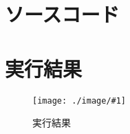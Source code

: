 \documentclass[a4paper,11pt]{ltjsarticle}
\newcommand{\fig}[4]{
    \begin{figure}[htbp]
      \centering
      \texttt{[image: ./image/\#1]}
      \caption{#2}
      \label{fig:#3}
    \end{figure}
  }
\begin{document}
\section{ソースコード}






\section{実行結果}
\fig{result.png}{実行結果}{result}{}
\end{document}

